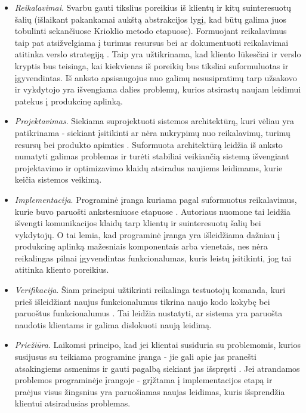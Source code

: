 \documentclass{VUMIFPSkursinis}
\begin{document}
\begin{itemize}
  \item \textit{Reikalavimai}. Svarbu gauti tikslius poreikius iš klientų ir kitų suinteresuotų šalių (išlaikant pakankamai aukštą abstrakcijos lygį, kad būtų galima juos tobulinti sekančiuose Krioklio metodo etapuose). Formuojant reikalavimus taip pat atsižvelgiama į turimus resursus bei ar dokumentuoti reikalavimai atitinka verslo strategiją \cite{SaltKetvirtas}. Taip yra užtikrinama, kad kliento lūkesčiai ir verslo kryptis bus teisinga, kai kiekvienas iš poreikių bus tiksliai suformuluotas ir įgyvendintas. Iš anksto apsisaugojus nuo galimų nesusipratimų tarp užsakovo ir vykdytojo yra išvengiama dalies problemų, kurios atsirastų naujam leidimui patekus į produkcinę aplinką.

  \item \textit{Projektavimas}. Siekiama suprojektuoti sistemos architektūrą, kuri vėliau yra patikrinama - siekiant įsitikinti ar nėra nukrypimų nuo reikalavimų, turimų resursų bei produkto apimties \cite{SaltKetvirtas}. Suformuota architektūrą leidžia iš anksto numatyti galimas problemas ir turėti stabiliai veikiančią sistemą išvengiant projektavimo ir optimizavimo klaidų atsiradus naujiems leidimams, kurie keičia sistemos veikimą. 
  
  \item \textit{Implementacija}. Programinė įranga kuriama pagal suformuotus reikalavimus, kurie buvo paruošti ankstesniuose etapuose \cite{SaltPenktas}.  Autoriaus nuomone tai leidžia išvengti komunikacijos klaidų tarp klientų ir suinteresuotų šalių bei vykdytojų. O tai lemia, kad programinė įranga yra išleidžiama dažniau į produkcinę aplinką mažesniais komponentais arba vienetais, nes nėra reikalingas pilnai įgyvendintas funkcionalumas, kuris leistų įsitikinti, jog tai atitinka kliento poreikius.
  
  \item \textit{Verifikacija}. Šiam principui užtikrinti reikalinga testuotojų komanda, kuri prieš išleidžiant naujus funkcionalumus tikrina naujo kodo kokybę bei paruoštus funkcionalumus \cite{SaltKetvirtas}. Tai leidžia nustatyti, ar sistema yra paruošta naudotis klientams ir galima dislokuoti naują leidimą.
  
  \item \textit{Priežiūra}. Laikomsi principo, kad jei klientai susiduria su problemomis, kurios susijusus su teikiama programine įranga - jie gali apie jas pranešti atsakingiems asmenims ir gauti pagalbą siekiant jas išspręsti \cite{SaltKetvirtas}. Jei atrandamos problemos programinėje įrangoje - grįžtama į implementacijos etapą ir praėjus visus žingsnius yra paruošiamas naujas leidimas, kuris išsprendžia klientui atsiradusias problemas.
\end{itemize}
\end{document}
